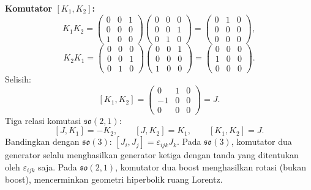 \vspace{0.5em}
\noindent \textbf{Komutator $[K_1, K_2]$:}
\begin{equation}
    K_1 K_2 = \begin{pmatrix}0&0&1\\0&0&0\\1&0&0\end{pmatrix}\!\begin{pmatrix}0&0&0\\0&0&1\\0&1&0\end{pmatrix}
    = \begin{pmatrix}0&1&0\\0&0&0\\0&0&0\end{pmatrix},
\end{equation}
\begin{equation}
    K_2 K_1 = \begin{pmatrix}0&0&0\\0&0&1\\0&1&0\end{pmatrix}\!\begin{pmatrix}0&0&1\\0&0&0\\1&0&0\end{pmatrix}
    = \begin{pmatrix}0&0&0\\1&0&0\\0&0&0\end{pmatrix}.
\end{equation}
Selisih:
\begin{equation}\label{a2-eq:K1K2}
    [K_1, K_2] = \begin{pmatrix}0&1&0\\-1&0&0\\0&0&0\end{pmatrix} = J.
\end{equation}
Tiga relasi komutasi $\mathfrak{so}(2,1)$:
\begin{equation}\label{a2-eq:so21-comm}
    [J, K_1] = -K_2, \qquad [J, K_2] = K_1, \qquad [K_1, K_2] = J.
\end{equation}
Bandingkan dengan $\mathfrak{so}(3)$: $[J_i,J_j] = \varepsilon_{ijk}J_k$. Pada $\mathfrak{so}(3)$, komutator dua generator selalu menghasilkan generator ketiga dengan tanda yang ditentukan oleh $\varepsilon_{ijk}$ saja. Pada $\mathfrak{so}(2,1)$, komutator dua boost menghasilkan rotasi (bukan boost), mencerminkan geometri hiperbolik ruang Lorentz.


